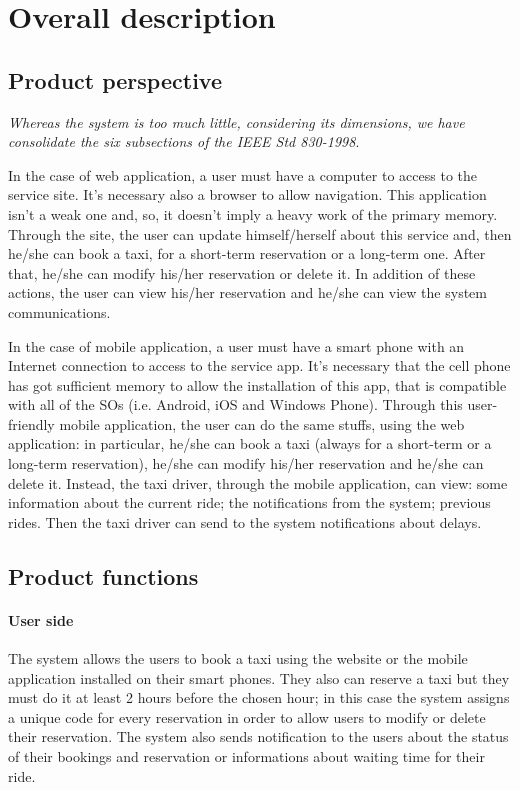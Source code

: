 \section{Overall description}
	\subsection{Product perspective}
		\emph{Whereas the system is too much little, considering its dimensions, we have consolidate the six subsections of the IEEE Std 830-1998}.
		\vspace{10pt}
		
		In the case of web application, a user must have a computer to access to the service site. It's necessary also a browser to allow navigation. This application isn't a weak one and, so, it doesn't imply a heavy work of the primary memory. 
		Through the site, the user can update himself/herself about this service and, then he/she can book a taxi, for a short-term reservation or a long-term one. After that, he/she can modify his/her reservation or delete it. In addition of these actions, the user can view his/her reservation and he/she can view the system communications.
		
		In the case of mobile application, a user must have a smart phone with an Internet connection to access to the service app. It's necessary that the cell phone has got sufficient memory to allow the installation of this app, that is compatible with all of the SOs (i.e. Android, iOS and Windows Phone).
		Through this user-friendly mobile application, the user can do the same stuffs, using the web application: in particular, he/she can book a taxi (always for a short-term or a long-term reservation), he/she can modify his/her reservation and he/she can delete it.
		Instead, the taxi driver, through the mobile application, can view: some information about the current ride; the notifications from the system; previous rides. Then the taxi driver can send to the system notifications about delays.  
	\subsection{Product functions}
		\paragraph{User side}The system allows the users to book a taxi using the website or the mobile application installed on their smart phones. They also can reserve a taxi but they must do it at least 2 hours before the chosen hour; in this case the system assigns a unique code for every reservation in order to allow users to modify or delete their reservation. The system also sends notification to the users about the status of their bookings and reservation or informations about waiting time for their ride.
